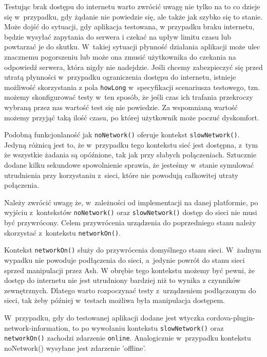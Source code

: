 \documentclass[brudnopis]{xmgr}
\begin{document}
Testując brak dostępu do internetu warto zwrócić uwagę nie tylko na to co dzieje się w~przypadku, gdy żądanie nie powiedzie się, ale także jak szybko się to stanie. Może dojść do sytuacji, gdy aplikacja testowana, w przypadku braku internetu, będzie wysyłać zapytania do serwera i czekać na upływ limitu czasu lub powtarzać je do skutku. W~takiej sytuacji płynność działania aplikacji może ulec znacznemu pogorszeniu lub może ona zmusić użytkownika do czekania na odpowiedź serwera, która nigdy nie nadejdzie. Jeśli chcemy zabezpieczyć się przed utratą płynności w~przypadku ograniczenia dostępu do internetu, istnieje możliwość skorzystania z pola \texttt{howLong} w~specyfikacji scenariusza testowego, tzn. możemy skonfigurować testy w~ten sposób, że jeśli czas ich trafania przekroczy wybraną przez nas wartość test się nie powiedzie. Za wspomnianą wartość możemy przyjąć taką ilość czasu, po której użytkownik może poczuć dyskomfort. 

Podobną funkcjonlaność jak \texttt{noNetwork()} oferuje kontekst \texttt{slowNetwork()}. Jedyną różnicą jest to, że w~przypadku tego kontekstu sieć jest dostępna, z~tym że wszystkie żadania są opóźnione, tak jak przy słabych połączeniach. Sztucznie dodane kilku sekundowe spowolnienie sprawia, że jesteśmy w~stanie symulować utrudnienia przy korzystaniu z~sieci, które nie powodują całkowitej utraty połączenia. 

Należy zwrócić uwagę że, w~zależności od implementacji na danej platformie, po wyjściu z~kontekstów \texttt{noNetwork()} oraz \texttt{slowNetwork()} dostęp do sieci nie musi być przywrócony. Celem przywrócenia urządzenia do poprzedniego stanu należy skorzystać z~kontekstu \texttt{networkOn()}. 

Kontekst \texttt{networkOn()} służy do przywrócenia domyślnego stanu sieci. W~żadnym wypadku nie powoduje podłączenia do sieci, a~jedynie powrót do stanu sieci sprzed manipulacji przez Ash. W obrębie tego kontekstu możemy być pewni, że dostęp do internetu nie jest utrudniony bardziej niż to wynika z czynników zewnętrznych. Dlatego warto rozpoczynać testy z~urządzeniem podłączonym do sieci, tak żeby później w~testach możliwa była manipulacja dostępem.

W~przypadku, gdy do testowanej aplikacji dodane jest wtyczka cordova-plugin-network-information,  to po wywołaniu kontekstu \texttt{slowNetwork()} oraz \texttt{networkOn()} zachodzi zdarzenie \texttt{online}. Analogicznie w~przypadku kontekstu noNetwork() wysyłane jest zdarzenie 'offline'. 
\end{document}

